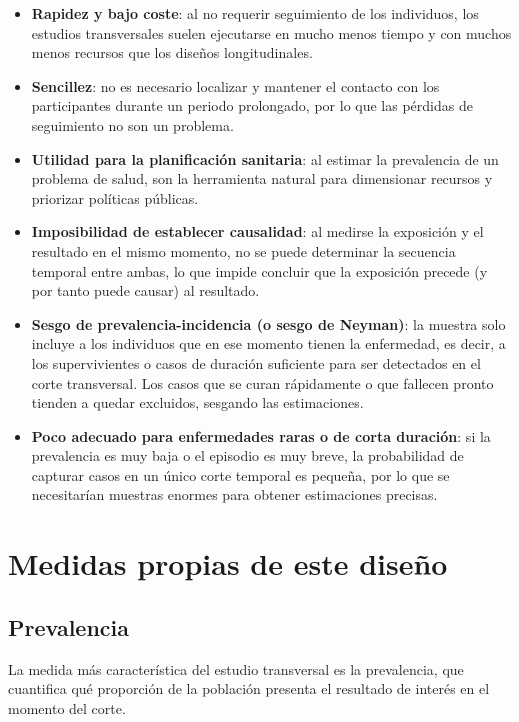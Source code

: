 \documentclass[
  spanish,
  a4paper,
]{scrreport}
\providecommand{\tightlist}{%
  \setlength{\itemsep}{0pt}\setlength{\parskip}{0pt}}
\theoremstyle{definition}
\theoremstyle{definition}
\theoremstyle{remark}
\begin{document}
\begin{itemize}
\tightlist
\item
  \textbf{Rapidez y bajo coste}: al no requerir seguimiento de los
  individuos, los estudios transversales suelen ejecutarse en mucho
  menos tiempo y con muchos menos recursos que los diseños
  longitudinales.
\item
  \textbf{Sencillez}: no es necesario localizar y mantener el contacto
  con los participantes durante un periodo prolongado, por lo que las
  pérdidas de seguimiento no son un problema.
\item
  \textbf{Utilidad para la planificación sanitaria}: al estimar la
  prevalencia de un problema de salud, son la herramienta natural para
  dimensionar recursos y priorizar políticas públicas.
\item
  \textbf{Imposibilidad de establecer causalidad}: al medirse la
  exposición y el resultado en el mismo momento, no se puede determinar
  la secuencia temporal entre ambas, lo que impide concluir que la
  exposición precede (y por tanto puede causar) al resultado.
\item
  \textbf{Sesgo de prevalencia-incidencia (o sesgo de Neyman)}: la
  muestra solo incluye a los individuos que en ese momento tienen la
  enfermedad, es decir, a los supervivientes o casos de duración
  suficiente para ser detectados en el corte transversal. Los casos que
  se curan rápidamente o que fallecen pronto tienden a quedar excluidos,
  sesgando las estimaciones.
\item
  \textbf{Poco adecuado para enfermedades raras o de corta duración}: si
  la prevalencia es muy baja o el episodio es muy breve, la probabilidad
  de capturar casos en un único corte temporal es pequeña, por lo que se
  necesitarían muestras enormes para obtener estimaciones precisas.
\end{itemize}

\section{Medidas propias de este
diseño}\label{medidas-propias-de-este-diseuxf1o-1}

\subsection{Prevalencia}\label{prevalencia}

La medida más característica del estudio transversal es la prevalencia,
que cuantifica qué proporción de la población presenta el resultado de
interés en el momento del corte.
\end{document}
